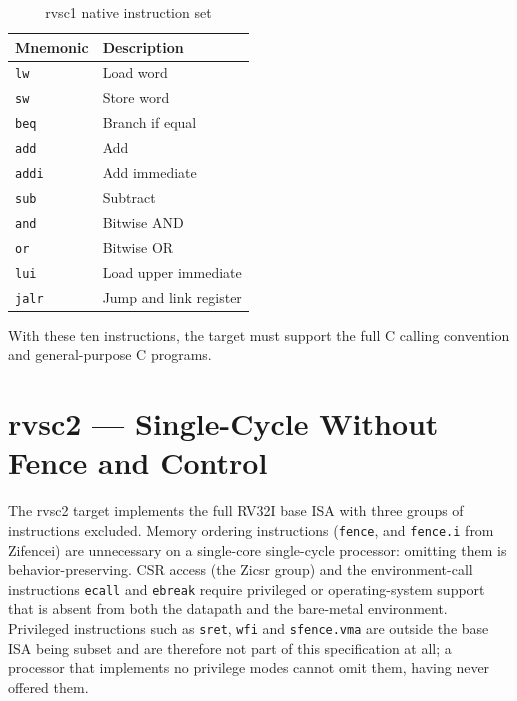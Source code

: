 \begin{table}[htb]
\centering
\caption{rvsc1 native instruction set}
\label{tab:rvsc1-isa}
\begin{tabular}{ll}
\toprule
\textbf{Mnemonic} & \textbf{Description} \\
\midrule
\texttt{lw}   & Load word \\
\texttt{sw}   & Store word \\
\texttt{beq}  & Branch if equal \\
\texttt{add}  & Add \\
\texttt{addi} & Add immediate \\
\texttt{sub}  & Subtract \\
\texttt{and}  & Bitwise AND \\
\texttt{or}   & Bitwise OR \\
\texttt{lui}  & Load upper immediate \\
\texttt{jalr} & Jump and link register \\
\bottomrule
\end{tabular}
\end{table}

With these ten instructions, the target must support the full C calling convention and general-purpose
C programs.

\section{rvsc2 --- Single-Cycle Without Fence and Control}

The rvsc2 target implements the full RV32I base ISA with three groups of instructions excluded. Memory
ordering instructions (\texttt{fence}, and \texttt{fence.i} from Zifencei) are unnecessary on a
single-core single-cycle processor: omitting them is behavior-preserving. CSR access (the Zicsr group)
and the environment-call instructions \texttt{ecall} and \texttt{ebreak} require privileged or
operating-system support that is absent from both the datapath and the bare-metal environment.
Privileged instructions such as \texttt{sret}, \texttt{wfi} and \texttt{sfence.vma} are outside the
base ISA being subset and are therefore not part of this specification at all; a processor that
implements no privilege modes cannot omit them, having never offered them.

